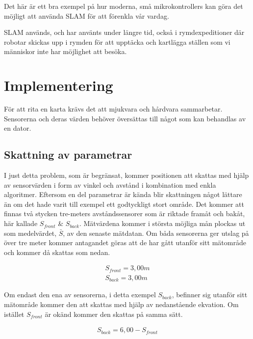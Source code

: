 \documentclass[a4paper,12pt,fleqn]{article}
\begin{document}
Det här är ett bra exempel på hur moderna, små mikrokontrollers kan göra det möjligt att använda SLAM för att förenkla vår vardag.

SLAM används, och har använts under längre tid, också i rymdexpeditioner där robotar skickas upp i rymden för att upptäcka och kartlägga ställen som vi människor inte har möjlighet att besöka. 

\newpage
\section{Implementering}

För att rita en karta krävs det att mjukvara och hårdvara sammarbetar. Sensorerna och deras värden behöver översättas till något som kan behandlas av en dator. 


\subsection{Skattning av parametrar}

I just detta problem, som är begränsat, kommer positionen att skattas med hjälp av sensorvärden i form av vinkel och avstånd i kombination med enkla algoritmer. Eftersom en del parametrar är kända blir skattningen något lättare än om det hade varit till exempel ett godtyckligt stort område. Det kommer att finnas två stycken tre-meters avståndssensorer som är riktade framåt och bakåt, här kallade $S_{front}$ \& $S_{back}$. Mätvärdena kommer i största möjliga mån plockas ut som medelvärdet, $\bar{S}$, av den senaste mätdatan. Om båda sensorerna ger utslag på över tre meter kommer antagandet göras att de har gått utanför sitt mätområde och kommer då skattas som nedan. 

\begin{gather}
	S_{front}=3,00 m \\
	S_{back}=3,00 m
\end{gather}

Om endast den ena av sensorerna, i detta exempel $S_{back}$, befinner sig utanför sitt mätområde kommer den att skattas med hjälp av nedanstående ekvation. Om istället $S_{front}$ är okänd kommer den skattas på samma sätt. 

\begin{gather}
	S_{back}=6,00-S_{front}
\end{gather}
\end{document}
